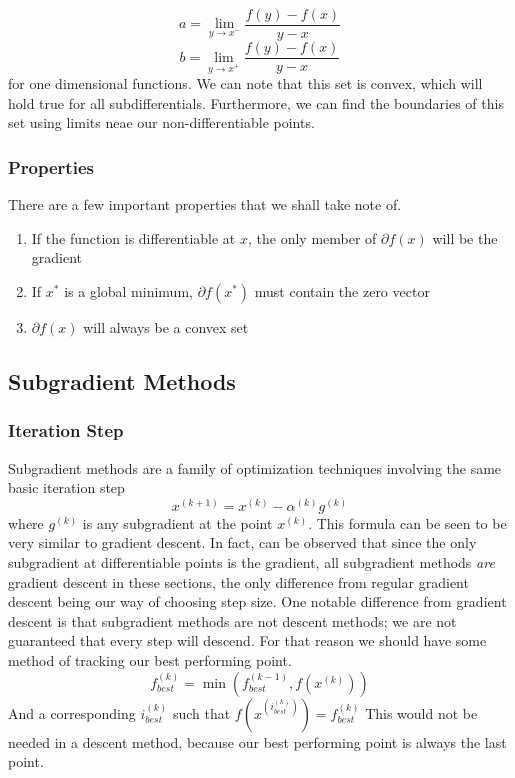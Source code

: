 \documentclass[conference]{IEEEtran}
\begin{document}
\begin{equation}\label{eq:subdifferential a def}
a = \lim_{y \rightarrow x^-} \frac{f(y)-f(x)}{y-x}
\end{equation}
\begin{equation}\label{eq:subdifferential b def}
b = \lim_{y \rightarrow x^+} \frac{f(y)-f(x)}{y-x}
\end{equation}
for one dimensional functions. We can note that this set is convex, which will hold true for all subdifferentials. Furthermore, we can find the boundaries of this set using limits neae our non-differentiable points.

\subsubsection{Properties}
There are a few important properties that we shall take note of.
\begin{enumerate}
    \item If the function is differentiable at \(x\), the only member of \(\partial f(x)\) will be the gradient
    \item If \(x^*\) is a global minimum, \(\partial f(x^*)\) must contain the zero vector
    \item \(\partial f(x)\) will always be a convex set
\end{enumerate}

\subsection{Subgradient Methods}
\subsubsection{Iteration Step}
Subgradient methods are a family of optimization techniques involving the same basic iteration step
\begin{equation}\label{eq: subgradient method iteration}
x^{(k+1)} = x^{(k)} - \alpha^{(k)}g^{(k)}
\end{equation}
where \(g^{(k)}\) is any subgradient at the point \(x^{(k)}\). This formula can be seen to be very similar to gradient descent. In fact, can be observed that since the only subgradient at differentiable points is the gradient, all subgradient methods \textit{are} gradient descent in these sections, the only difference from regular gradient descent being our way of choosing step size. One notable difference from gradient descent is that subgradient methods are not descent methods; we are not guaranteed that every step will descend. For that reason we should have some method of tracking our best performing point.
\begin{equation}\label{eq:track best}
f^{(k)}_{best} = \min (f^{(k-1)}_{best}, f(x^{(k)}))
\end{equation}
And a corresponding \(i^{(k)}_{best}\) such that \(f(x^{(i^{(k)}_{best})}) = f^{(k)}_{best}\)
This would not be needed in a descent method, because our best performing point is always the last point.
\end{document}
